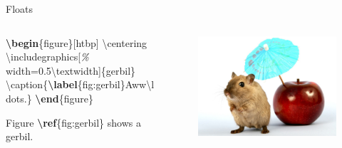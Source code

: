 \documentclass[,aspectratio=43]{beamer}
\newcommand{\VERB}{\Verb[commandchars=\\\{\}]}
\newenvironment{Shaded}{\begin{snugshade}}{\end{snugshade}}
\newcommand{\BuiltInTok}[1]{#1}
\newcommand{\CommentTok}[1]{\textcolor[rgb]{0.38,0.63,0.69}{\textit{#1}}}
\newcommand{\ExtensionTok}[1]{#1}
\newcommand{\FunctionTok}[1]{\textcolor[rgb]{0.02,0.16,0.49}{#1}}
\newcommand{\KeywordTok}[1]{\textcolor[rgb]{0.00,0.44,0.13}{\textbf{#1}}}
\newcommand{\NormalTok}[1]{#1}
\begin{document}
\begin{frame}[fragile]{Floats}
\protect\hypertarget{floats}{}

\begin{columns}[T]
\begin{column}{0.6\textwidth}
\small
\vspace{-1em}

\begin{Shaded}
\begin{Highlighting}[]
\KeywordTok{\textbackslash{}begin}\NormalTok{\{}\ExtensionTok{figure}\NormalTok{\}[htbp]}
\FunctionTok{\textbackslash{}centering} 
\BuiltInTok{\textbackslash{}includegraphics}\NormalTok{[}\CommentTok{\%}
\NormalTok{width=0.5}\FunctionTok{\textbackslash{}textwidth}\NormalTok{]\{}\ExtensionTok{gerbil}\NormalTok{\} }
\FunctionTok{\textbackslash{}caption}\NormalTok{\{}\KeywordTok{\textbackslash{}label}\NormalTok{\{}\ExtensionTok{fig:gerbil}\NormalTok{\}Aww}\FunctionTok{\textbackslash{}ldots}\NormalTok{.\} }
\KeywordTok{\textbackslash{}end}\NormalTok{\{}\ExtensionTok{figure}\NormalTok{\}}

\NormalTok{Figure }\KeywordTok{\textbackslash{}ref}\NormalTok{\{}\ExtensionTok{fig:gerbil}\NormalTok{\} shows a gerbil.}
\end{Highlighting}
\end{Shaded}
\end{column}

\begin{column}{0.36\textwidth}
\vspace{-1em}
\begin{figure}

{\centering \includegraphics[width=1\linewidth]{figure/gerbil} 

}
\end{figure}
\end{column}
\end{columns}
\end{frame}
\end{document}
